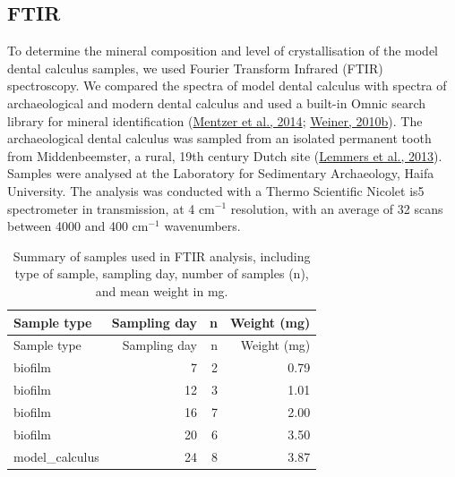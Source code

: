\documentclass[
  letterpaper,
]{book}
\begin{document}
\hypertarget{ftir}{%
\subsection{FTIR}\label{ftir}}

To determine the mineral composition and level of crystallisation of the
model dental calculus samples, we used Fourier Transform Infrared (FTIR)
spectroscopy. We compared the spectra of model dental calculus with
spectra of archaeological and modern dental calculus and used a built-in
Omnic search library for mineral identification
(\protect\hyperlink{ref-mentzerDistributionAuthigenic2014}{Mentzer et
al., 2014};
\protect\hyperlink{ref-weinerInfraredSpectroscopy2010}{Weiner, 2010b}).
The archaeological dental calculus was sampled from an isolated
permanent tooth from Middenbeemster, a rural, 19th century Dutch site
(\protect\hyperlink{ref-lemmersMiddenbeemster2013}{Lemmers et al.,
2013}). Samples were analysed at the Laboratory for Sedimentary
Archaeology, Haifa University. The analysis was conducted with a Thermo
Scientific Nicolet is5 spectrometer in transmission, at 4 cm\(^{-1}\)
resolution, with an average of 32 scans between 4000 and 400 cm\(^{-1}\)
wavenumbers.

\hypertarget{tbl-ftir-byoc}{}
\begin{longtable}[]{@{}lrrr@{}}
\caption{\label{tbl-ftir-byoc}Summary of samples used in FTIR analysis,
including type of sample, sampling day, number of samples (n), and mean
weight in mg.}\tabularnewline
\toprule\noalign{}
Sample type & Sampling day & n & Weight (mg) \\
\midrule\noalign{}
\endfirsthead
\toprule\noalign{}
Sample type & Sampling day & n & Weight (mg) \\
\midrule\noalign{}
\endhead
\bottomrule\noalign{}
\endlastfoot
biofilm & 7 & 2 & 0.79 \\
biofilm & 12 & 3 & 1.01 \\
biofilm & 16 & 7 & 2.00 \\
biofilm & 20 & 6 & 3.50 \\
model\_calculus & 24 & 8 & 3.87 \\
\end{longtable}
\end{document}

